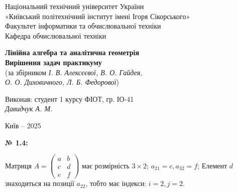 \documentclass[12pt,a4paper]{article}
\begin{document}
    \begin{titlepage}

        \thispagestyle{empty}
        \begin{center}
            \large
            Національний технічний університет України\\
            «Київський політехнічний інститут імені Ігоря Сікорського»\\[1em]
            Факультет інформатики та обчислювальної техніки\\
            Кафедра обчислювальної техніки
        \end{center}

        \vfill

        \begin{center}
            \textbf{\LARGE Лінійна алгебра та аналітична геометрія}\\[2em]
            \textbf{\Large Вирішення задач практикуму}\\[0.5em]
            (за збірником \textit{І. В. Алексєєвої, В. О. Гайдея,\\
            О. О. Диховичного, Л. Б. Федорової})
        \end{center}

        \vfill

        \begin{flushright}
            Виконав: студент 1 курсу ФІОТ, гр. ІО-41\\
            \textit{Давидчук А. М.}\\
        \end{flushright}

        \vfill

        \begin{center}
            Київ -- 2025
        \end{center}

    \end{titlepage}

    \noindent \textbf{№ 1.4:}

    Матриця 
    \( A = 
    \begin{pmatrix}
    a & b \\
    c & d \\
    e & f
    \end{pmatrix}
    \)
    має розмірність $3\times2$; $a_{21} = c, a_{32} = f$; Елемент $d$ знаходиться на позиції $a_{22}$, тобто має індекси: $i = 2, j = 2$.

    \vspace{1em}
\end{document}
